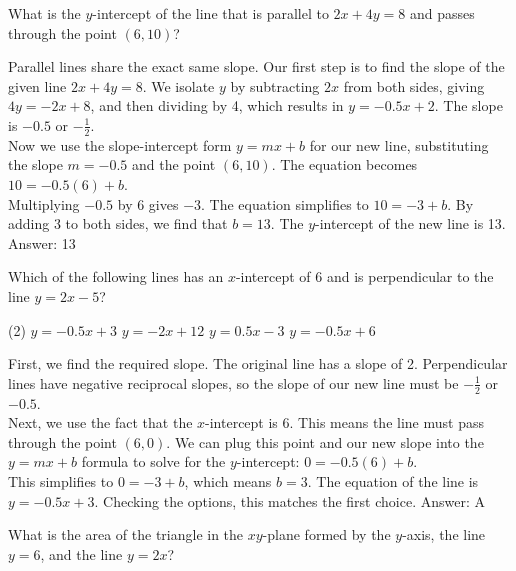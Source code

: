\documentclass[11pt,paper=a4,answers]{exam}
\begin{document}
\begin{questions}
\question
What is the $y$-intercept of the line that is parallel to $2x + 4y = 8$ and passes through the point $(6, 10)$?

\begin{solution}
Parallel lines share the exact same slope. Our first step is to find the slope of the given line $2x + 4y = 8$. We isolate $y$ by subtracting $2x$ from both sides, giving $4y = -2x + 8$, and then dividing by 4, which results in $y = -0.5x + 2$. The slope is $-0.5$ or $-\frac{1}{2}$.
\\[10pt]
Now we use the slope-intercept form $y = mx + b$ for our new line, substituting the slope $m = -0.5$ and the point $(6, 10)$. The equation becomes $10 = -0.5(6) + b$. 
\\[10pt]
Multiplying $-0.5$ by 6 gives $-3$. The equation simplifies to $10 = -3 + b$. By adding 3 to both sides, we find that $b = 13$. The $y$-intercept of the new line is 13.
\vspace{15pt}
Answer: \colorbox{yellow!100}{13}
\end{solution}

\question
Which of the following lines has an $x$-intercept of 6 and is perpendicular to the line $y = 2x - 5$?
\begin{tasks}(2)
    \task $y = -0.5x + 3$
    \task $y = -2x + 12$
    \task $y = 0.5x - 3$
    \task $y = -0.5x + 6$
\end{tasks}

\begin{solution}
First, we find the required slope. The original line has a slope of 2. Perpendicular lines have negative reciprocal slopes, so the slope of our new line must be $-\frac{1}{2}$ or $-0.5$.
\\[10pt]
Next, we use the fact that the $x$-intercept is 6. This means the line must pass through the point $(6, 0)$. We can plug this point and our new slope into the $y = mx + b$ formula to solve for the $y$-intercept: $0 = -0.5(6) + b$. 
\\[10pt]
This simplifies to $0 = -3 + b$, which means $b = 3$. The equation of the line is $y = -0.5x + 3$. Checking the options, this matches the first choice.
\vspace{15pt}
Answer: \colorbox{yellow!100}{A}
\end{solution}

\question
What is the area of the triangle in the $xy$-plane formed by the $y$-axis, the line $y = 6$, and the line $y = 2x$?


\end{questions}
\end{document}
